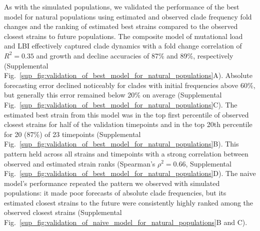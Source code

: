 As with the simulated populations, we validated the performance of the best model for natural populations using estimated and observed clade frequency fold changes and the ranking of estimated best strains compared to the observed closest strains to future populations.
The composite model of mutational load and LBI effectively captured clade dynamics with a fold change correlation of $R^2 = 0.35$ and growth and decline accuracies of 87\% and 89\%, respectively (Supplemental Fig.~\ref{sup_fig:validation_of_best_model_for_natural_populations}A).
Absolute forecasting error declined noticeably for clades with initial frequencies above 60\%, but generally this error remained below 20\% on average (Supplemental Fig.~\ref{sup_fig:validation_of_best_model_for_natural_populations}C).
The estimated best strain from this model was in the top first percentile of observed closest strains for half of the validation timepoints and in the top 20th percentile for 20 (87\%) of 23 timepoints (Supplemental Fig.~\ref{sup_fig:validation_of_best_model_for_natural_populations}B).
This pattern held across all strains and timepoints with a strong correlation between observed and estimated strain ranks (Spearman's $\rho^2 = 0.66$, Supplemental Fig.~\ref{sup_fig:validation_of_best_model_for_natural_populations}D).
The naive model's performance repeated the pattern we observed with simulated populations: it made poor forecasts of absolute clade frequencies, but its estimated closest strains to the future were consistently highly ranked among the observed closest strains (Supplemental Fig.~\ref{sup_fig:validation_of_naive_model_for_natural_populations}B and C).

